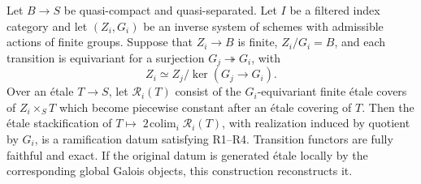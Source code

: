 \begin{proposition}
\label{D:prop5}
Let $B\to S$ be quasi-compact and quasi-separated. Let $I$ be a
filtered index category and let $(Z_i,G_i)$ be an inverse system of
schemes with admissible actions of finite groups. Suppose that
$Z_i\to B$ is finite, $Z_i/G_i=B$, and each transition is equivariant
for a surjection $G_j\twoheadrightarrow G_i$, with
\[
 Z_i\simeq Z_j/\ker(G_j\to G_i).
\]
Over an \'etale $T\to S$, let $\mathscr R_i(T)$ consist of the
$G_i$-equivariant finite \'etale covers of $Z_i\times_ST$
which become piecewise constant after an \'etale covering of $T$.
Then the \'etale stackification of
$T\mapsto\mathop{\mathrm{2\!\operatorname{colim}}}_i\mathscr R_i(T)$,
with realization induced by quotient by $G_i$, is a ramification datum
satisfying R1--R4. Transition functors are fully faithful and exact.
If the original datum is generated \'etale locally by the corresponding
global Galois objects, this construction reconstructs it.
\end{proposition}
